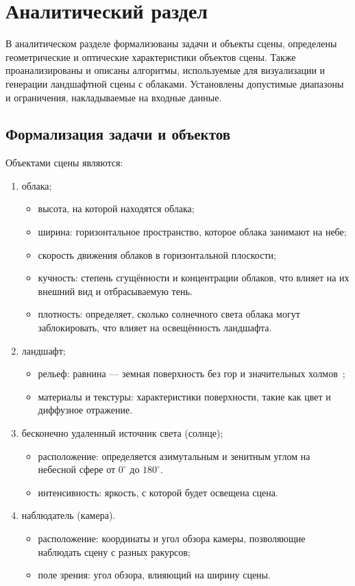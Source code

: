 \chapter{Аналитический раздел}
В аналитическом разделе формализованы задачи и объекты сцены, определены геометрические и оптические характеристики объектов сцены. Также проанализированы и описаны алгоритмы, используемые для визуализации и генерации ландшафтной сцены с облаками. Установлены допустимые диапазоны и ограничения, накладываемые на входные данные.

\section{Формализация задачи и объектов}

Объектами сцены являются:
\begin{enumerate}
	\item облака;
	\begin{itemize}
		\item высота, на которой находятся облака;
		\item ширина: горизонтальное пространство, которое облака занимают на небе;
		\item скорость движения облаков в горизонтальной плоскости;
		\item кучность: степень сгущённости и концентрации облаков, что влияет на их внешний вид и отбрасываемую тень.
		\item плотность: определяет, сколько солнечного света облака могут заблокировать, что влияет на освещённость ландшафта.
	\end{itemize}
	\item ландшафт;
	\begin{itemize}
		\item рельеф: равнина --- земная поверхность без гор и значительных холмов~\cite{ushakov};
		\item материалы и текстуры: характеристики поверхности, такие как цвет и диффузное отражение.
	\end{itemize}
	\item бесконечно удаленный источник света (солнце);
	\begin{itemize}
		\item расположение: определяется азимутальным и зенитным углом на небесной сфере от $0^{\circ}$ до $180^{\circ}$.
		\item интенсивность: яркость, с которой будет освещена сцена.
	\end{itemize}
	\item наблюдатель (камера).
	\begin{itemize}
		\item расположение: координаты и угол обзора камеры, позволяющие наблюдать сцену с разных ракурсов;
		\item поле зрения: угол обзора, влияющий на ширину сцены.
	\end{itemize}
\end{enumerate}


